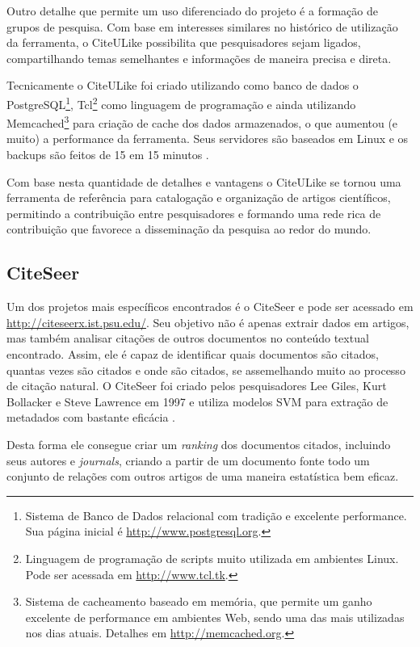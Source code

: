 Outro detalhe que permite um uso diferenciado do projeto é a formação de grupos de pesquisa. Com base em interesses similares no histórico de utilização da ferramenta, o CiteULike possibilita que pesquisadores sejam ligados, compartilhando temas semelhantes e informações de maneira precisa e direta.

Tecnicamente o CiteULike foi criado utilizando como banco de dados o PostgreSQL\footnote{Sistema de Banco de Dados relacional com tradição e excelente performance. Sua página inicial é \url{http://www.postgresql.org}.}, Tcl\footnote{Linguagem de programação de scripts muito utilizada em ambientes Linux. Pode ser acessada em \url{http://www.tcl.tk}.} como linguagem de programação e ainda utilizando Memcached\footnote{Sistema de cacheamento baseado em memória, que permite um ganho excelente de performance em ambientes Web, sendo uma das mais utilizadas nos dias atuais. Detalhes em \url{http://memcached.org}.} para criação de cache dos dados armazenados, o que aumentou (e muito) a performance da ferramenta. Seus servidores são baseados em Linux e os backups são feitos de 15 em 15 minutos \cite{citeulike}.

Com base nesta quantidade de detalhes e vantagens o CiteULike se tornou uma ferramenta de referência para catalogação e organização de artigos científicos, permitindo a contribuição entre pesquisadores e formando uma rede rica de contribuição que favorece a disseminação da pesquisa ao redor do mundo.

\subsection{CiteSeer}
\label{ssec:citeseer}

Um dos projetos mais específicos encontrados é o CiteSeer \cite{citeseer} e pode ser acessado em \url{http://citeseerx.ist.psu.edu/}. Seu objetivo não é apenas extrair dados em artigos, mas também analisar citações de outros documentos no conteúdo textual encontrado. Assim, ele é capaz de identificar quais documentos são citados, quantas vezes são citados e onde são citados, se assemelhando muito ao processo de citação natural. O CiteSeer foi criado pelos pesquisadores Lee Giles, Kurt Bollacker e Steve Lawrence em 1997 e utiliza modelos SVM para extração de metadados com bastante eficácia \cite{Granitzer-2012-LayoutBased}.

Desta forma ele consegue criar um \textit{ranking} dos documentos citados, incluindo seus autores e \textit{journals}, criando a partir de um documento fonte todo um conjunto de relações com outros artigos de uma maneira estatística bem eficaz.

